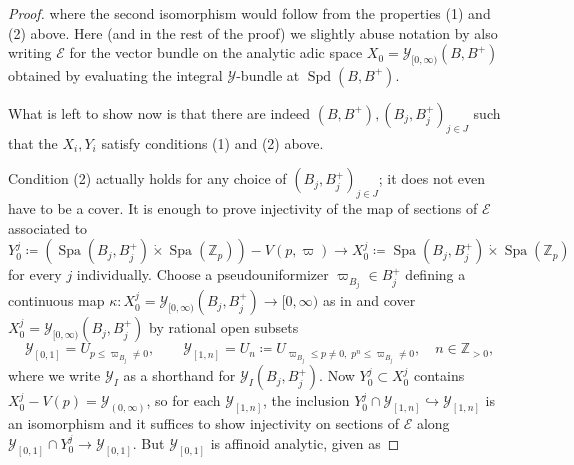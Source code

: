 \documentclass[10pt,twoside]{article}
\numberwithin{equation}{section}
\theoremstyle{plain}
\theoremstyle{definition}
\DeclareMathOperator{\Spa}{Spa}
\DeclareMathOperator{\Spd}{Spd}
\newcommand{\ZZ}{\mathbb{Z}}
\newcommand{\QQ}{\mathbb{Q}}
\newcommand{\MCE}{\mathcal{E}}
\newcommand{\MCY}{\mathcal{Y}}
\newcommand{\Yco}{\MCY_{[0,\infty)}}
\newcommand{\Yoo}{\MCY_{(0,\infty)}}
\begin{document}
\begin{proof}
where the second isomorphism would follow from the properties (1) and (2) above. Here (and in the rest of the proof) we slightly abuse notation by also writing \(\MCE\) for the vector bundle on the analytic adic space \(X_0=\Yco(B,B^+)\) obtained by evaluating the integral \(\MCY\)-bundle at \(\Spd(B,B^+)\).\par
What is left to show now is that there are indeed \((B,B^+),(B_j,B_j^+)_{j\in J}\) such that the \(X_i,Y_i\) satisfy conditions (1) and (2) above. \par
Condition (2) actually holds for any choice of \((B_j,B_j^+)_{j\in J}\); it does not even have to be a cover. It is enough to prove injectivity of the map of sections of \(\MCE\) associated to
\[Y_0^j\coloneqq(\Spa(B_j,B_j^+)\dot\times \Spa(\ZZ_p))-V(p,\varpi)\longrightarrow X_0^j\coloneqq\Spa(B_j,B_j^+)\dot\times \Spa(\ZZ_p) \]
for every \(j\) individually. Choose a pseudouniformizer \(\varpi_{B_j}^{}\in B_j^+\) defining a continuous map \(\kappa\colon X_0^j=\Yco(B_j,B^+_j)\to [0,\infty)\) as in \cite[Figure 5 in section 12.1]{SW20} and cover \(X_0^j=\Yco(B_j,B^+_j)\) by rational open subsets
\[\MCY_{[0,1]}=U_{p\leq \varpi^{}_{B_j}\neq 0}, \qquad\MCY_{[1,n]}= U_n\coloneqq U_{\varpi^{}_{B_j}\leq p\neq 0, \;p^n\leq\varpi^{}_{B_j} \neq 0},\quad n\in \ZZ_{>0},\]
where we write \(\MCY_I\) as a shorthand for \(\MCY_I(B_j,B_j^+)\). Now \(Y_0^j\subset X_0^j\) contains \(X_0^j-V(p)=\Yoo\), so for each \(\MCY_{[1,n]}\), the inclusion \(Y_0^j\cap \MCY_{[1,n]} \hookrightarrow \MCY_{[1,n]}\) is an isomorphism and it suffices to show injectivity on sections of \(\MCE\) along \(\MCY_{[0,1]}\cap Y_0^j\to \MCY_{[0,1]}\). But \(\MCY_{[0,1]}\) is affinoid analytic, given as 

\end{proof}
\end{document}
